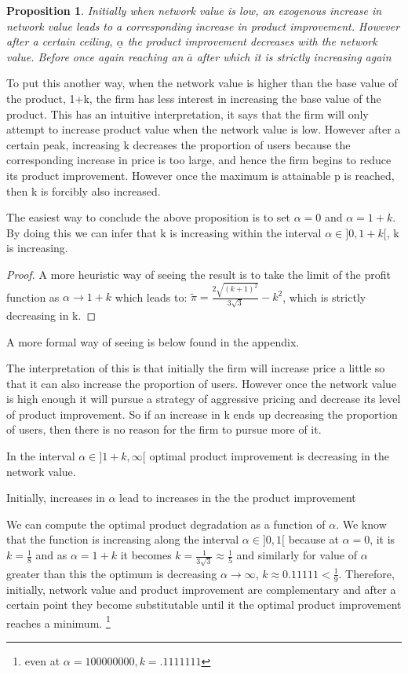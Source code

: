 \documentclass{article}
\newtheorem{proposition}{Proposition}
\begin{document}
\begin{proposition}
Initially when network value is low, an exogenous increase in network value leads to a corresponding increase in product improvement. However after a certain ceiling, $\underline{\alpha}$ the product improvement decreases with the network value. Before once again reaching an $\overline{a}$ after which it is strictly increasing again
\end{proposition}

To put this another way, when the network value is higher than the base value of the product, 1+k, the firm has less interest in increasing the base value of the product. This has an intuitive interpretation, it says that the firm will only attempt to increase product value when the network value is low. However after a certain peak, increasing k decreases the proportion of users because the corresponding increase in price is too large, and hence the firm begins to reduce its product improvement. However once the maximum is attainable p is reached, then k is forcibly also increased. 

The easiest way to conclude the above proposition is to set $\alpha=0$ and $\alpha=1+k$. By doing this we can infer that k is increasing within the interval $\alpha \in ]0,1+k[$, k is increasing. 

\begin{proof}
A more heuristic way of seeing the result is to take the limit of the profit function as $\alpha \rightarrow 1+k$ which leads to: $\tilde{\pi} = \frac{2 \sqrt{(k+1)^2}}{3 \sqrt{3}}-k^2$, which is strictly decreasing in k. 
\end{proof}

A more formal way of seeing is below found in the appendix.


The interpretation of this is that initially the firm will increase price a little so that it can also increase the proportion of users. However once the network value is high enough it will pursue a strategy of aggressive pricing and decrease its level of product improvement. So if an increase in k ends up decreasing the proportion of users, then there is no reason for the firm to pursue more of it. 

In the interval $\alpha \in ]1+k,\infty[$ optimal product improvement is decreasing in the network value.

Initially, increases in $\alpha$ lead to increases in the the product improvement 

We can compute the optimal product degradation as a function of $\alpha$. We know that the function is increasing along the interval $\alpha \in ]0,1[$ because at $\alpha=0$, it is $k = \frac{1}{8}$ and as $\alpha=1+k$ it becomes $k = \frac{1}{3 \sqrt{3}} \approx \frac{1}{5}$ and similarly for value of $\alpha$ greater than this the optimum is decreasing $\alpha \rightarrow \infty $, $k \approx 0.11111<\frac{1}{9}$. Therefore, initially, network value and product improvement are complementary and after a certain point they become substitutable until it the optimal product improvement reaches a minimum. 
\footnote{even at $\alpha=100 000 000, k=.1111111$  }
\end{document}
